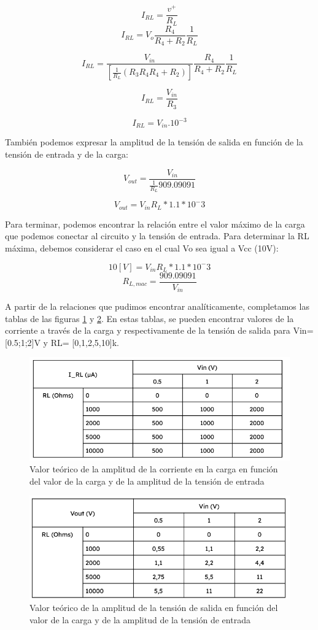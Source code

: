 \[I_{RL}= \frac{v^+}{R_L}\]
\[I_{RL}= V_o\frac{R_4}{R_4 + R_2} \frac{1}{R_L}\]


\[I_{RL}=\frac{V_{in}}{\left[\frac{1}{R_L}(R_3{R_4}{R_4 + R_2})\right]}\frac{R_4}{R_4 + R_2}\frac{1}{R_L}\]

\[I_{RL}= \frac{V_{in}}{R_3}\]

\[I_{RL}= V_{in}.10^{-3}\]

También podemos expresar la amplitud de la tensión de salida en función de la tensión de entrada y de la carga:

\[V_{out} = \frac{V_{in}}{\frac{1}{R_L}909.09091}\]

\[V_{out} = V_{in}R_L*1.1*10^-3\]

Para terminar, podemos encontrar la relación entre el valor máximo de la carga que podemos conectar al circuito y la tensión de entrada. Para determinar la RL máxima, debemos considerar el caso en el cual Vo sea igual a Vcc (10V):

\[10[V] = V_{in}R_L*1.1*10^-3\]
\[R_{L,mac} = \frac{909.09091}{V_{in}}\]


A partir de la relaciones que pudimos encontrar analíticamente, completamos las tablas de las figuras \ref{fig:IRL_vs_carga} y \ref{fig:Vo_vs_carga}. En estas tablas, se pueden encontrar valores de la corriente a través de la carga y respectivamente de la tensión de salida para Vin=[0.5;1;2]V y RL= [0,1,2,5,10]k.

\begin{figure}[H]
    \centering
    \includegraphics[width=0.7\linewidth]{Secciones/Circuito2/Tabla3.png}
    \caption{Valor teórico de la amplitud de la corriente en la carga en función del valor de la carga y de la amplitud de la tensión de entrada}
    \label{fig:IRL_vs_carga}
\end{figure}

\begin{figure}[H]
    \centering
    \includegraphics[width=0.7\linewidth]{Secciones/Circuito2/Tabla4.png}
    \caption{Valor teórico de la amplitud de la tensión de salida en función del valor de la carga y de la amplitud de la tensión de entrada}
    \label{fig:Vo_vs_carga}
\end{figure}

